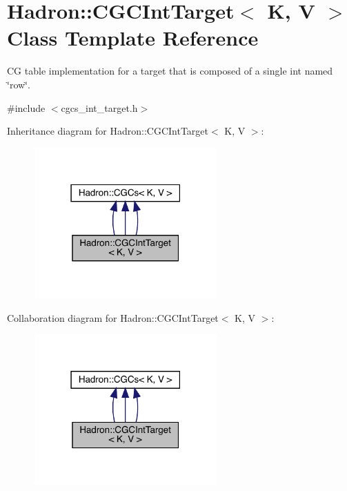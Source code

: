 \hypertarget{classHadron_1_1CGCIntTarget}{}\section{Hadron\+:\+:C\+G\+C\+Int\+Target$<$ K, V $>$ Class Template Reference}
\label{classHadron_1_1CGCIntTarget}


CG table implementation for a target that is composed of a single int named \char`\"{}row\char`\"{}.  




{\ttfamily \#include $<$cgcs\+\_\+int\+\_\+target.\+h$>$}



Inheritance diagram for Hadron\+:\+:C\+G\+C\+Int\+Target$<$ K, V $>$\+:
\nopagebreak
\begin{figure}[H]
\begin{center}
\leavevmode
\includegraphics[width=198pt]{de/d3f/classHadron_1_1CGCIntTarget__inherit__graph}
\end{center}
\end{figure}


Collaboration diagram for Hadron\+:\+:C\+G\+C\+Int\+Target$<$ K, V $>$\+:
\nopagebreak
\begin{figure}[H]
\begin{center}
\leavevmode
\includegraphics[width=198pt]{d7/d7c/classHadron_1_1CGCIntTarget__coll__graph}
\end{center}
\end{figure}
